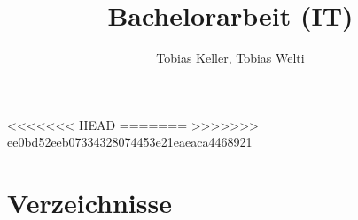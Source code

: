 %
<<<<<<< HEAD
=======
>>>>>>> ee0bd52eeb07334328074453e21eaeaca4468921
%




\title{Bachelorarbeit (IT)}
\author{Tobias Keller, Tobias Welti}


% 

\setcounter{page}{1}
%


\tableofcontents
\newpage





% 


\chapter{Verzeichnisse}\label{chap.verzeichnisse}
 
 \listoffigures
 \listoftables
 
 \lstlistoflistings





